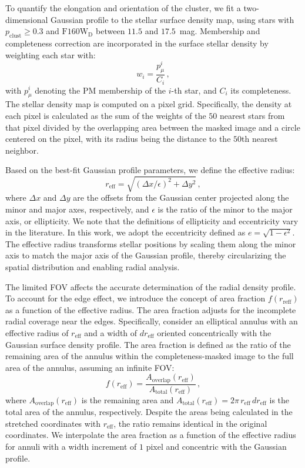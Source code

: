 \documentclass[12pt]{ucsddissertation}
\newcommand{\pmui}{p_{\mu}^i}
\newcommand{\reff}{r_\mathrm{eff}}
\begin{document}
\begin{CJK*}{UTF8}{gbsn}
To quantify the elongation and orientation of the cluster, we fit a two-dimensional Gaussian profile to the stellar surface density map, using stars with $p_\mathrm{clust} \geq 0.3$ and $\mathrm{F160W_D}$ between $11.5$ and $17.5$~mag. Membership and completeness correction are incorporated in the surface stellar density by weighting each star with:
\begin{equation}
    w_i = \frac{\pmui}{C_i}\,,
    \label{eq:weight}
\end{equation}
with $p_\mu^i$ denoting the PM membership of the $i$-th star, and $C_i$ its completeness. The stellar density map is computed on a pixel grid. Specifically, the density at each pixel is calculated as the sum of the weights of the $50$ nearest stars from that pixel divided by the overlapping area between the masked image and a circle centered on the pixel, with its radius being the distance to the $50$th nearest neighbor.

Based on the best-fit Gaussian profile parameters, we define the effective radius:
\begin{equation}
    \reff = \sqrt{\left(\Delta x/\epsilon\right)^2 + \Delta y^2}\,,
    \label{eq:reff}
\end{equation}
where $\Delta x$ and $\Delta y$ are the offsets from the Gaussian center projected along the minor and major axes, respectively, and $\epsilon$ is the ratio of the minor to the major axis, or ellipticity. We note that the definitions of ellipticity and eccentricity vary in the literature. In this work, we adopt the eccentricity defined as $e = \sqrt{1 - \epsilon^2}$. The effective radius transforms stellar positions by scaling them along the minor axis to match the major axis of the Gaussian profile, thereby circularizing the spatial distribution and enabling radial analysis.

The limited FOV affects the accurate determination of the radial density profile. To account for the edge effect, we introduce the concept of area fraction $f(r_\mathrm{reff})$ as a function of the effective radius. The area fraction adjusts for the incomplete radial coverage near the edges. Specifically, consider an elliptical annulus with an effective radius of $\reff$ and a width of $d\reff$ oriented concentrically with the Gaussian surface density profile. The area fraction is defined as the ratio of the remaining area of the annulus within the completeness-masked image to the full area of the annulus, assuming an infinite FOV:
\begin{equation}
    f(\reff) = \frac{A_\mathrm{overlap}(\reff)}{A_\mathrm{total}(\reff)}\,,
    \label{eq:area_fraction}
\end{equation}
where $A_\mathrm{overlap}(\reff)$ is the remaining area and $A_\mathrm{total}(\reff)=2\pi\, \reff\,d\reff$ is the total area of the annulus, respectively. Despite the areas being calculated in the stretched coordinates with $\reff$, the ratio remains identical in the original coordinates. We interpolate the area fraction as a function of the effective radius for annuli with a width increment of $1$ pixel and concentric with the Gaussian profile.


\end{CJK*}
\end{document}
